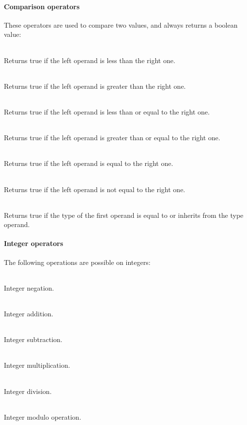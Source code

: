 \paragraph{Comparison operators}

These operators are used to compare two values, and always returns a boolean value:

\begin{dlist}
  \item {}\\
    Returns true if the left operand is less than the right one.
  \item {}\\
    Returns true if the left operand is greater than the right one.
  \item {}\\
    Returns true if the left operand is less than or equal to the right one.
  \item {}\\
    Returns true if the left operand is greater than or equal to the right one.
  \item {}\\
    Returns true if the left operand is equal to the right one.
  \item {}\\
    Returns true if the left operand is not equal to the right one.
  \item {}\\
    Returns true if the type of the first operand is equal to or inherits from
    the type operand.
\end{dlist}

\paragraph{Integer operators}

The following operations are possible on integers:

\begin{dlist}
  \item {} \\
    Integer negation.
  \item {} \\
    Integer addition.
  \item {} \\
    Integer subtraction.
  \item {} \\
    Integer multiplication.
  \item {} \\
    Integer division.
  \item {} \\
    Integer modulo operation.
\end{dlist}

